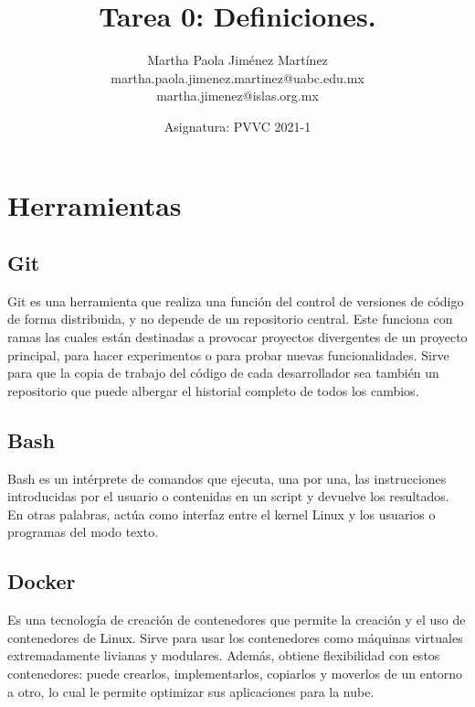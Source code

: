 \documentclass[12pt,letterpaper]{article}
\begin{document}
\title{\textbf{Tarea 0: 
Definiciones.}}
\author{Martha Paola Jim\'enez Mart\'inez \\
\small{martha.paola.jimenez.martinez@uabc.edu.mx} \\
\small{martha.jimenez@islas.org.mx}}
\date{ \small{Asignatura: PVVC 2021-1}
} 
\maketitle

\section*{Herramientas}
\subsection*{Git}
Git es una herramienta que realiza una funci\'on del control de versiones de c\'odigo de forma distribuida, y no depende de un repositorio central.
Este funciona con ramas las cuales est\'an destinadas a provocar proyectos divergentes de un proyecto principal, para hacer experimentos o para probar nuevas funcionalidades.
Sirve para que la copia de trabajo del c\'odigo de cada desarrollador sea tambi\'en un repositorio que puede albergar el historial completo de todos los cambios.

\subsection*{Bash}
Bash es un int\'erprete de comandos que ejecuta, una por una, las instrucciones introducidas por el usuario o contenidas en un script y devuelve los resultados. En otras palabras, act\'ua como interfaz entre el kernel Linux y los usuarios o programas del modo texto.

\subsection*{Docker}
Es una tecnolog\'ia de creación de contenedores que permite la creaci\'on y el uso de contenedores de Linux.
Sirve para usar los contenedores como m\'aquinas virtuales extremadamente livianas y modulares. Adem\'as, obtiene flexibilidad con estos contenedores: puede crearlos, implementarlos, copiarlos y moverlos de un entorno a otro, lo cual le permite optimizar sus aplicaciones para la nube.
\end{document}
